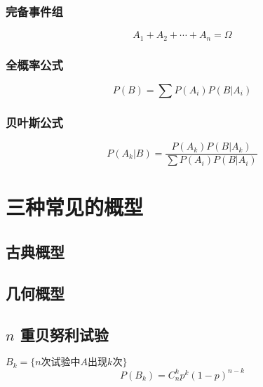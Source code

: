 \subsubsection{完备事件组}
\label{ssub:完备事件组}

\[
    A_1 + A_2 + \cdots + A_n = \Omega
\]

\subsubsection{全概率公式}
\label{ssub:全概率公式}

\[
    P(B) = \sum P(A_i) P(B | A_i)
\]

\subsubsection{贝叶斯公式}
\label{ssub:贝叶斯公式}

\[
    P(A_k | B ) = \frac{P(A_k) P(B | A_k)}{\sum P(A_i) P(B | A_i)}
\]

\section{三种常见的概型}
\label{sec:三种常见的概型}

\subsection{古典概型}
\label{sub:古典概型}

\subsection{几何概型}
\label{sub:几何概型}

\subsection{$n$ 重贝努利试验}
\label{sub:n_重贝努利试验}

$B_k= \{ n \text{次试验中}A \text{出现}k\text{次} \}$
\[
    P(B_k) = C_n^k p^k (1-p)^{n-k}
\]
